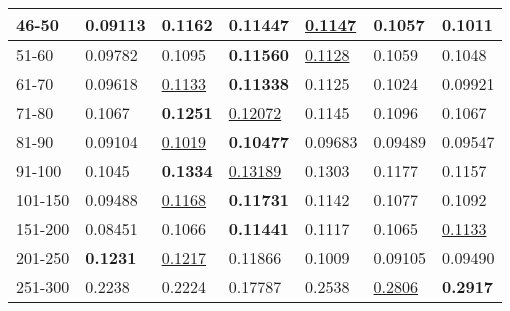 \begin{table*}[]
\begin{tabular}{|l|l|l|l|l|l|l|}
        46-50   & 0.09113                        & \textbf{0.1162}                & 0.11447                        & \underline{0.1147}             & 0.1057                         & 0.1011                         \\ \hline
        51-60   & 0.09782                        & 0.1095                         & \textbf{0.11560}               & \underline{0.1128}             & 0.1059                         & 0.1048                         \\ \hline
        61-70   & 0.09618                        & \underline{0.1133}             & \textbf{0.11338}               & 0.1125                         & 0.1024                         & 0.09921                        \\ \hline
        71-80   & 0.1067                         & \textbf{0.1251}                & \underline{0.12072}            & 0.1145                         & 0.1096                         & 0.1067                         \\ \hline
        81-90   & 0.09104                        & \underline{0.1019}             & \textbf{0.10477}               & 0.09683                        & 0.09489                        & 0.09547                        \\ \hline
        91-100  & 0.1045                         & \textbf{0.1334}                & \underline{0.13189}            & 0.1303                         & 0.1177                         & 0.1157                         \\ \hline
        101-150 & 0.09488                        & \underline{0.1168}             & \textbf{0.11731}               & 0.1142                         & 0.1077                         & 0.1092                         \\ \hline
        151-200 & 0.08451                        & 0.1066                         & \textbf{0.11441}               & 0.1117                         & 0.1065                         & \underline{0.1133}             \\ \hline
        201-250 & \textbf{0.1231}                & \underline{0.1217}             & 0.11866                        & 0.1009                         & 0.09105                        & 0.09490                        \\ \hline
        251-300 & 0.2238                         & 0.2224                         & 0.17787                        & 0.2538                         & \underline{0.2806}             & \textbf{0.2917}                \\ \hline

\end{tabular}
\end{table*}
